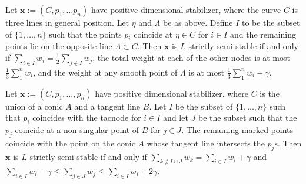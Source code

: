 \documentclass[10pt,a4paper]{amsart}
\begin{document}
\begin{lemma}[Case of $C(3A_1)$]
\label{lemma:Wall_3distinctlines}
    Let $\mathbf{x}:=(C, p_1, \dots p_n)$ have positive dimensional stabilizer, where the curve $C$ is three lines in general position. Let $\eta$ and $\Lambda$ be as above. Define $I$ to be the subset of $\{1, \dots , n\}$ such that the points $p_i$ coincide at $\eta \in C$ for $i \in I$ and the remaining points lie on the opposite line $\Lambda \subset C$. Then $\mathbf{x}$ is $L$ strictly semi-stable if and only if $\sum_{i \in I}w_i = \frac{1}{2} \sum_{j \notin I} w_j$, the total weight at each of the other nodes is at most $\frac{1}{3} \sum_1^n w_i$, and the weight at any smooth point of $\Lambda$  is at most $\frac{1}{3}\sum_1^n w_i + \gamma $.

    
\end{lemma}

\begin{lemma}[Case of $C(A_3)$] \label{Lemma:wallC(A_3)}
    Let $\mathbf{x} := (C, p_1, \dots , p_n)$ have positive dimensional stabilizer, where $C$ is the union of a conic $A$ and a tangent line $B$. Let $I$ be the subset of $\{1, \dots ,n\}$ such that $p_i$ coincides with the tacnode for $i \in I$ and let $J$ be the subset such that the $p_j$ coincide at a non-singular point of $B$ for $j \in J$. The remaining marked points coincide with the point on the conic $A$ whose tangent line intersects the $p_j$s. Then $\mathbf{x}$ is $L$ strictly semi-stable if and only if $\sum_{k \notin I \cup J} w_k = \sum_{i \in I} w_i + \gamma$ and $\sum_{i \in I} w_i - \gamma \leq \sum_{j \in J} w_j \leq \sum_{i \in I} w_i + 2 \gamma$.
\end{lemma}
\end{document}
